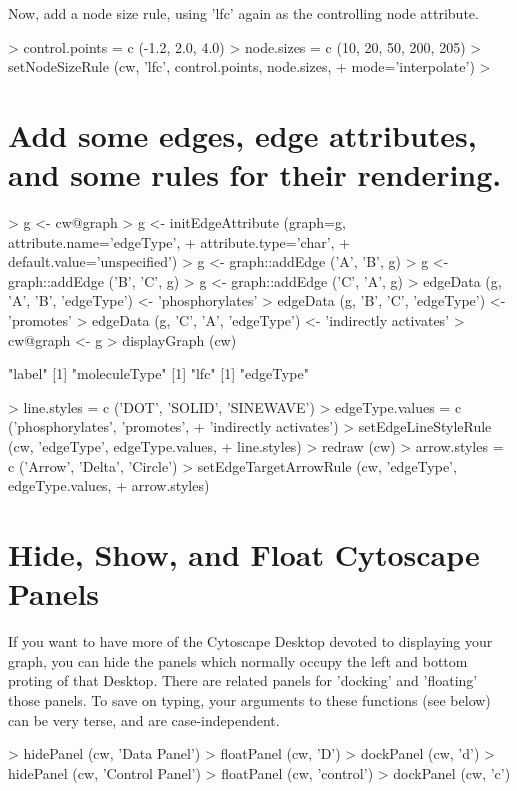 \documentclass[12pt]{article}
\begin{document}
Now, add a node size rule, using 'lfc' again as the controlling node attribute.

\begin{Schunk}
\begin{Sinput}
>   control.points = c (-1.2, 2.0, 4.0)
>   node.sizes     = c (10, 20, 50, 200, 205)
>   setNodeSizeRule (cw, 'lfc', control.points, node.sizes,
+                    mode='interpolate')
> 
\end{Sinput}
\end{Schunk}
\section{Add some edges, edge attributes, and some rules for their rendering.}
\begin{Schunk}
\begin{Sinput}
>   g <- cw@graph
>   g <- initEdgeAttribute (graph=g,  attribute.name='edgeType',
+                           attribute.type='char',
+                           default.value='unspecified')
>   g <- graph::addEdge ('A', 'B', g)
>   g <- graph::addEdge ('B', 'C', g)
>   g <- graph::addEdge ('C', 'A', g)
>   edgeData (g, 'A', 'B', 'edgeType') <- 'phosphorylates'
>   edgeData (g, 'B', 'C', 'edgeType') <- 'promotes'
>   edgeData (g, 'C', 'A', 'edgeType') <- 'indirectly activates'
>   cw@graph <- g
>   displayGraph (cw)
\end{Sinput}
\begin{Soutput}
[1] "label"
[1] "moleculeType"
[1] "lfc"
[1] "edgeType"
\end{Soutput}
\begin{Sinput}
>   line.styles = c ('DOT', 'SOLID', 'SINEWAVE')
>   edgeType.values = c ('phosphorylates', 'promotes',
+                        'indirectly activates')
>   setEdgeLineStyleRule (cw, 'edgeType', edgeType.values,
+                         line.styles)
>   redraw (cw)
>   arrow.styles = c ('Arrow', 'Delta', 'Circle')
>   setEdgeTargetArrowRule (cw, 'edgeType', edgeType.values,
+                           arrow.styles)
\end{Sinput}
\end{Schunk}

\section{Hide, Show, and Float Cytoscape Panels}
If you want to have more of the Cytoscape Desktop devoted to displaying your graph, you can hide the panels which normally occupy the left and bottom proting of that Desktop.  There are related panels for 'docking' and 'floating' those panels.  To save on typing, your arguments to these functions (see below) can be very terse, and are case-independent.
\begin{Schunk}
\begin{Sinput}
>   hidePanel (cw, 'Data Panel')
>   floatPanel (cw, 'D')
>   dockPanel (cw, 'd')
>   hidePanel (cw, 'Control Panel')
>   floatPanel (cw, 'control')
>   dockPanel (cw, 'c')
\end{Sinput}
\end{Schunk}
\end{document}
